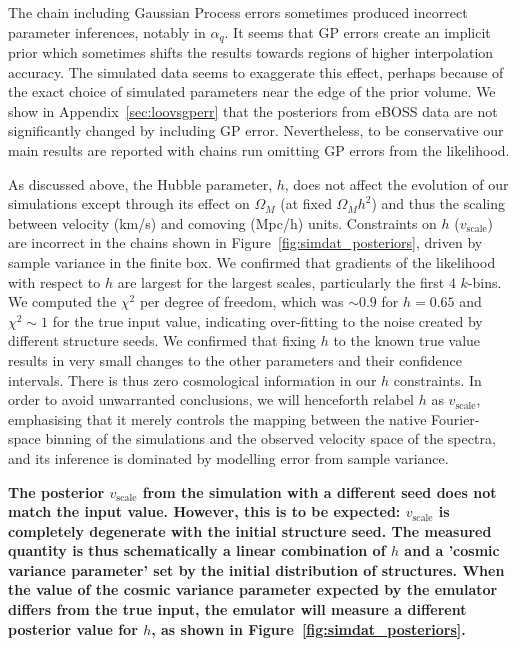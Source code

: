 The chain including Gaussian Process errors sometimes produced incorrect parameter inferences, notably in $\alpha_q$.
It seems that GP errors create an implicit prior which sometimes shifts the results towards regions of higher interpolation accuracy.
The simulated data seems to exaggerate this effect, perhaps because of the exact choice of simulated parameters near the edge of the prior volume.
We show in Appendix~\ref{sec:loovsgperr} that the posteriors from eBOSS data are not significantly changed by including GP error.
Nevertheless, to be conservative our main results are reported with chains run omitting GP errors from the likelihood.

As discussed above, the Hubble parameter, $h$, does not affect the evolution of our simulations except through its effect on $\Omega_M$ (at fixed $\Omega_M h^2$) and thus the scaling between velocity (km/s) and comoving (Mpc/h) units.
Constraints on $h$ ($v_\mathrm{scale}$) are incorrect in the chains shown in Figure~\ref{fig:simdat_posteriors}, driven by sample variance in the finite box.
We confirmed that gradients of the likelihood with respect to $h$ are largest for the largest scales, particularly the first $4$ $k$-bins.
We computed the $\chi^2$ per degree of freedom, which was $\sim 0.9$ for $h = 0.65$ and $\chi^2 \sim 1$ for the true input value, indicating over-fitting to the noise created by different structure seeds.
We confirmed that fixing $h$ to the known true value results in very small changes to the other parameters and their confidence intervals.
There is thus zero cosmological information in our $h$ constraints.
In order to avoid unwarranted conclusions, we will henceforth relabel $h$ as $v_\mathrm{scale}$, emphasising that it merely controls the mapping between the native Fourier-space binning of the simulations and the observed velocity space of the spectra, and its inference is dominated by modelling error from sample variance. 

\textbf{The posterior $v_\mathrm{scale}$ from the simulation with a different seed does not match the input value. However, this is to be expected: $v_\mathrm{scale}$ is completely degenerate with the initial structure seed. The measured quantity is thus schematically a linear combination of $h$ and a 'cosmic variance parameter' set by the initial distribution of structures. When the value of the cosmic variance parameter expected by the emulator differs from the true input, the emulator will measure a different posterior value for $h$, as shown in Figure~\ref{fig:simdat_posteriors}.}